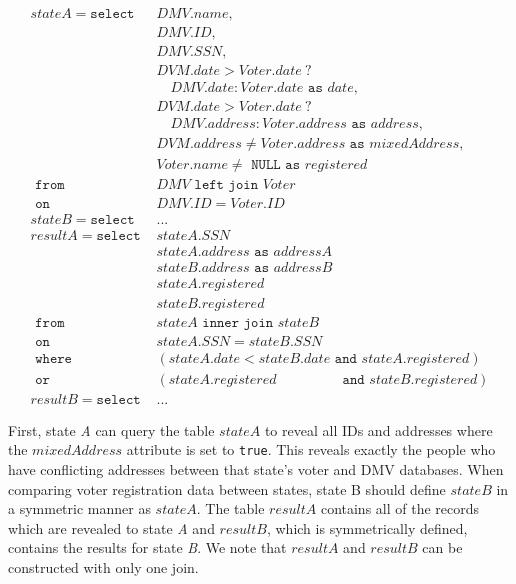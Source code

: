 {
	\scriptsize
	\begin{align*}	
	stateA = \texttt{select }& DMV.name,\\
							 & DMV.ID, \\
							 & DMV.SSN, \\
							 & DVM.date > Voter.date \ ?\\
							 &\quad DMV.date : Voter.date \texttt{ as } date,\\
							 & DVM.date > Voter.date \ ?\\
							 &\quad  DMV.address : Voter.address \texttt{ as } address,\\
							 & DVM.address \neq Voter.address \texttt{ as } mixedAddress, \\ 
							 & Voter.name \neq \texttt{ NULL as } registered \\
			 \texttt{ from } & DMV \texttt{ left join } Voter \\
			   \texttt{ on } & DMV.ID = Voter.ID \\
			   stateB = \texttt{select }&...\\
	resultA = \texttt{select } & stateA.SSN \\
							   & stateA.address \texttt{ as } addressA\\
							   & stateB.address \texttt{ as } addressB\\
							   & stateA.registered \\
							   & stateB.registered \\
			   \texttt{ from } & stateA \texttt{ inner join } stateB \\
   			     \texttt{ on } & stateA.SSN = stateB.SSN\\
   			  \texttt{ where } & (stateA.date < stateB.date \texttt{ and } stateA.registered ) \\
     			   \texttt{ or } & (stateA.registered \qquad \qquad \ \, \texttt{ and }stateB.registered )\\
   resultB = \texttt{select } & ...
	\end{align*}
}

First, state \emph{A} can query the table $stateA$ to reveal all IDs and addresses where the $mixedAddress$ attribute is set to \texttt{true}. This reveals exactly the people who have conflicting addresses between that state's voter and DMV databases. When comparing voter registration data between states, state B should define $stateB$ in a symmetric manner as $stateA$. The table $resultA$ contains all of the records which are revealed to state \emph{A} and $resultB$, which is symmetrically defined, contains the results for state \emph{B}. We note that $resultA$ and $resultB$ can be constructed with only one join.

